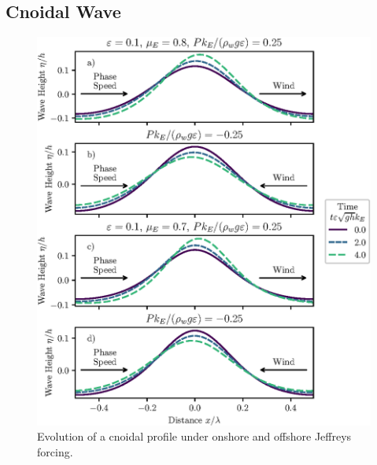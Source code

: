 \documentclass{jfm}
\let\Oldsubsection\subsection
\renewcommand{\subsection}{\FloatBarrier\Oldsubsection}
\begin{document}
\subsection{Cnoidal Wave}
\begin{figure}
  \centering
  \includegraphics{Snapshots-Positive-Negative-Cnoidal.eps}
  \caption{
    Evolution of a cnoidal profile under onshore and offshore Jeffreys
    forcing.
  }
\end{figure}
\end{document}
